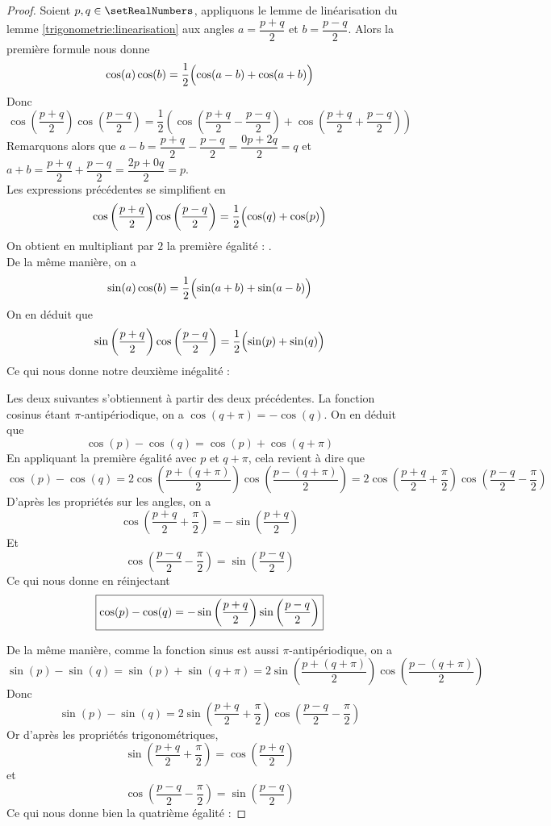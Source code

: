 \begin{proof} Soient $p, q \in \setRealNumbers$, appliquons le lemme de linéarisation du lemme \ref{trigonometrie:linearisation} aux angles $a = \dfrac{p+q}{2}$ et $b = \dfrac{p-q}{2}$. Alors la première formule nous donne
\[
\cos(a)\cos(b)=\dfrac{1}{2}\Bigl(\cos(a-b)+\cos(a+b)\Bigr)
\]
Donc 
\[
\cos\left(\dfrac{p+q}{2}\right)\cos\left(\dfrac{p-q}{2}\right)=\dfrac{1}{2}\left(\cos\left(\dfrac{p+q}{2} - \dfrac{p-q}{2}\right)+\cos\left(\dfrac{p+q}{2} + \dfrac{p-q}{2}\right)\right)
\]
Remarquons alors que $a-b=\dfrac{p+q}{2} - \dfrac{p-q}{2} = \dfrac{0p + 2q}{2} = q$ et $a+b=\dfrac{p+q}{2} + \dfrac{p-q}{2} = \dfrac{2p+0q}{2}=p$.\\
Les expressions précédentes se simplifient en 
\[
\cos\left(\dfrac{p+q}{2}\right)\cos\left(\dfrac{p-q}{2}\right)=\dfrac{1}{2}\Bigl(\cos(q)+\cos(p)\Bigr)
\]
On obtient en multipliant par $2$ la première égalité : .\\
De la même manière, on a
\[
\sin(a)\cos(b)=\dfrac{1}{2}\Bigl(\sin(a+b)+\sin(a-b)\Bigr)
\]
On en déduit que 
\[
\sin\left(\dfrac{p+q}{2}\right)\cos\left(\dfrac{p-q}{2}\right)=\dfrac{1}{2}\Bigl(\sin(p)+\sin(q)\Bigr)
\]
Ce qui nous donne notre deuxième inégalité : 

Les deux suivantes s'obtiennent à partir des deux précédentes. La fonction cosinus étant $\pi$-antipériodique, on a $\cos(q+\pi)=-\cos(q)$. On en déduit que 
\[
\cos(p)-\cos(q)=\cos(p)+\cos(q+\pi)
\]
En appliquant la première égalité avec $p$ et $q + \pi$, cela revient à dire que 
\[
\cos(p)-\cos(q)=2\cos\left(\dfrac{p+(q+\pi)}{2}\right)\cos\left(\dfrac{p-(q+\pi)}{2}\right)=2\cos\left(\dfrac{p+q}{2}+\dfrac{\pi}{2}\right)\cos\left(\dfrac{p-q}{2}-\dfrac{\pi}{2}\right)
\]
D'après les propriétés sur les angles, on a
\[
\cos\left(\dfrac{p+q}{2}+\dfrac{\pi}{2}\right) = -\sin\left(\dfrac{p+q}{2}\right)
\]
Et 
\[
\cos\left(\dfrac{p-q}{2}-\dfrac{\pi}{2}\right) = \sin\left(\dfrac{p-q}{2}\right)
\]
Ce qui nous donne en réinjectant 
\[
\fbox{$\cos(p)-\cos(q)=-\sin\left(\dfrac{p+q}{2}\right)\sin\left(\dfrac{p-q}{2}\right)$}
\]

De la même manière, comme la fonction sinus est aussi $\pi$-antipériodique, on a 
\[
\sin(p)-\sin(q)=\sin(p)+\sin(q+\pi)=2\sin\left(\dfrac{p+(q+\pi)}{2}\right)\cos\left(\dfrac{p-(q+\pi)}{2}\right)
\]
Donc 
\[
\sin(p)-\sin(q) = 2\sin\left(\dfrac{p+q}{2} + \dfrac{\pi}{2}\right)\cos\left(\dfrac{p-q}{2} - \dfrac{\pi}{2}\right)
\]
Or d'après les propriétés trigonométriques, 
\[
\sin\left(\dfrac{p+q}{2} + \dfrac{\pi}{2}\right) = \cos\left(\dfrac{p+q}{2}\right)
\]
et 
\[
\cos\left(\dfrac{p-q}{2} - \dfrac{\pi}{2}\right) = \sin\left(\dfrac{p-q}{2}\right)
\]
Ce qui nous donne bien la quatrième égalité : 
\end{proof}
